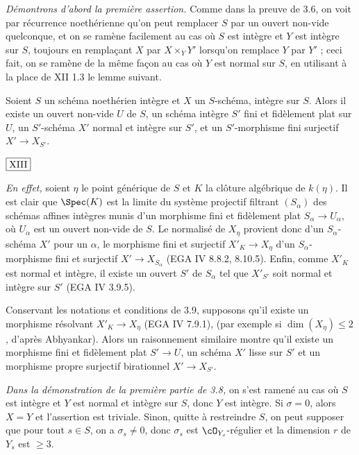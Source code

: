 \noindent\textit{Démontrons d'abord la première assertion.} Comme dans la preuve de 3.6, on voit par récurrence noethérienne qu'on peut remplacer $S$ par un ouvert non-vide quelconque, et on se ramène facilement au cas où $S$ est intègre et $Y$ est intègre sur $S$, toujours en remplaçant $X$ par $X \times_Y Y'$ lorsqu'on remplace $Y$ par $Y'$ ; ceci fait, on se ramène de la même façon au cas où $Y$ est normal sur $S$, en utilisant à la place de XII 1.3 le lemme suivant.

\begin{lem}\label{lem:3.9} Soient $S$ un schéma noethérien intègre et $X$ un $S$-schéma, intègre sur $S$. Alors il existe un ouvert non-vide $U$ de $S$, un schéma intègre $S'$ fini et fidèlement plat sur $U$, un $S'$-schéma $X'$ normal et intègre sur $S'$, et un $S'$-morphisme fini surjectif $X' \to X_{S'}$.
\end{lem}

\begin{flushright}
$\fbox{\text{XIII}}$
\end{flushright}

\noindent\textit{En effet,} soient $\eta$ le point générique de $S$ et $K$ la clôture algébrique de $k(\eta)$. Il est clair que $\Spec(K)$ est la limite du système projectif filtrant $(S_{\alpha})$ des schémas affines intègres munis d'un morphisme fini et fidèlement plat $S_{\alpha} \to U_{\alpha}$, où $U_{\alpha}$ est un ouvert non-vide de $S$. Le normalisé de $X_{\eta}$ provient donc d'un $S_{\alpha}$-schéma $X'$ pour un $\alpha$, le morphisme fini et surjectif $X'_K \to X_{\eta}$ d'un $S_{\alpha}$-morphisme fini et surjectif $X' \to X_{S_{\alpha}}$ (EGA IV 8.8.2, 8.10.5). Enfin, comme $X'_K$ est normal et intègre, il existe un ouvert $S'$ de $S_{\alpha}$ tel que $X'_{S'}$ soit normal et intègre sur $S'$ (EGA IV 3.9.5).

\begin{rem*}\label{rem:3.10}
Conservant les notations et conditions de 3.9, supposons qu'il existe un morphisme résolvant $X'_K \to X_{\eta}$ (EGA IV 7.9.1), (par exemple si $\dim(X_{\eta}) \leq 2$, d'après Abhyankar). Alors un raisonnement similaire montre qu'il existe un morphisme fini et fidèlement plat $S' \to U$, un schéma $X'$ lisse sur $S'$ et un morphisme propre surjectif birationnel $X' \to X_{S'}$.
\end{rem*}

\noindent\textit{Dans la démonstration de la première partie de 3.8,} on s'est ramené au cas où $S$ est intègre et $Y$ est normal et intègre sur $S$, donc $Y$ est intègre. Si $\sigma = 0$, alors $X=Y$ et l'assertion est triviale. Sinon, quitte à restreindre $S$, on peut supposer que pour tout $s \in S$, on a $\sigma_s \neq 0$, donc $\sigma_s$ est $\cO_{Y_s}$-régulier et la dimension $r$ de $Y_s$ est $\geq 3$.

